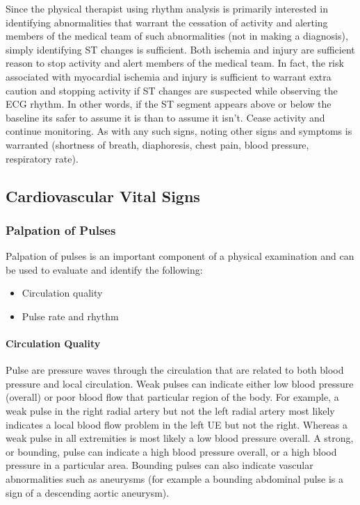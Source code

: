 Since the physical therapist using rhythm analysis is primarily interested in identifying abnormalities that warrant the cessation of activity and alerting members of the medical team of such abnormalities (not in making a diagnosis), simply identifying ST changes is sufficient. Both ischemia and injury are sufficient reason to stop activity and alert members of the medical team. In fact, the risk associated with myocardial ischemia and injury is sufficient to warrant extra caution and stopping activity if ST changes are suspected while observing the ECG rhythm. In other words, if the ST segment appears above or below the baseline its safer to assume it is than to assume it isn't. Cease activity and continue monitoring. As with any such signs, noting other signs and symptoms is warranted (shortness of breath, diaphoresis, chest pain, blood pressure, respiratory rate).

\subsection{Cardiovascular Vital Signs}

\subsubsection{Palpation of Pulses} 
Palpation of pulses is an important component of a physical examination and can be used to evaluate and identify the following:

\begin{itemize}
\item Circulation quality
\item Pulse rate and rhythm
\end{itemize}

\paragraph{Circulation Quality}

Pulse are pressure waves through the circulation that are related to both blood pressure and local circulation. Weak pulses can indicate either low blood pressure (overall) or poor blood flow that particular region of the body. For example, a weak pulse in the right radial artery but not the left radial artery most likely indicates a local blood flow problem in the left UE but not the right. Whereas a weak pulse in all extremities is most likely a low blood pressure overall. A strong, or bounding, pulse can indicate a high blood pressure overall, or a high blood pressure in a particular area. Bounding pulses can also indicate vascular abnormalities such as aneurysms (for example a bounding abdominal pulse is a sign of a descending aortic aneurysm).

